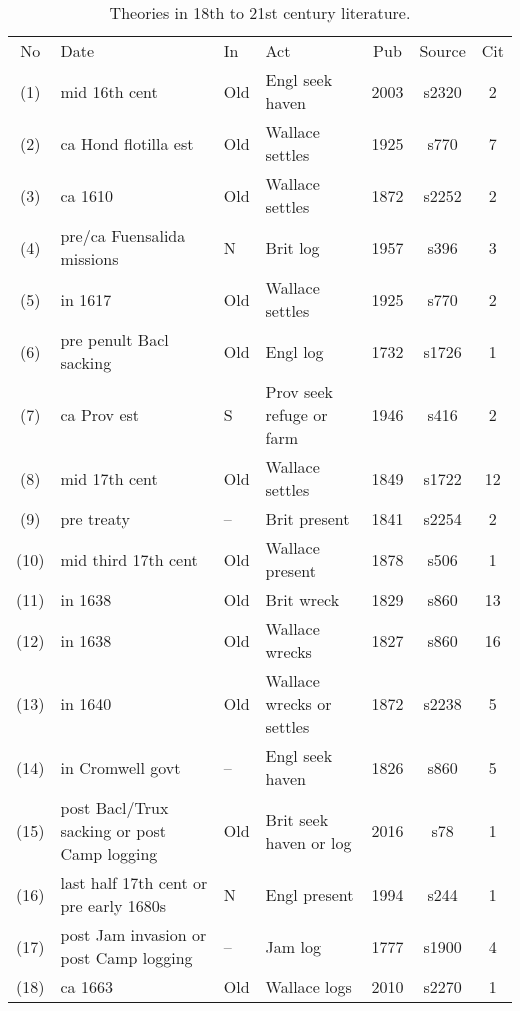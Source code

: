 \begin{table} %
\caption{Theories in 18th to 21st century literature.}
\label{tab:literature}
\begin{sideways}
\begin{tabular}{cp{.35\textheight}lp{.2\textheight}ccc}
No	&Date	&In	&Act	&Pub&Source	&Cit\\
(1)	&mid 16th cent	&Old	&Engl seek haven	&2003	&s2320	&2\\ %
(2)	&ca Hond flotilla est	&Old	&Wallace settles	&1925	&s770	&7\\ %
(3)	&ca 1610	&Old&Wallace settles	&1872	&s2252	&2\\ %
(4)	&pre/ca Fuensalida missions	&N	&Brit log	&1957	&s396	&3\\ %
(5)	&in 1617	&Old	&Wallace settles	&1925	&s770	&2\\ %
(6)	&pre penult Bacl sacking	&Old	&Engl log	&1732	&s1726	&1\\ %
(7)	&ca Prov est	&S &Prov seek refuge or farm	&1946	&s416	&2\\ %
(8)	&mid 17th cent	&Old	&Wallace settles	&1849	&s1722	&12\\ %
(9)	&pre treaty	&--	&Brit present	&1841	&s2254	&2\\ %
(10)	&mid third 17th cent	&Old	&Wallace present	&1878	&s506	&1\\ %
(11)	&in 1638	&Old	&Brit wreck	&1829	&s860	&13\\ %
(12)	&in 1638	&Old	&Wallace wrecks	&1827	&s860	&16\\ %
(13)	&in 1640	&Old	&Wallace wrecks or settles	&1872	&s2238	&5\\ %
(14)	&in Cromwell govt	&--	&Engl seek haven	&1826	&s860	&5\\ %
(15)	&post Bacl/Trux sacking or post Camp logging	&Old	&Brit seek haven or log	&2016	&s78	&1\\ %
(16)	&last half 17th cent or pre early 1680s	&N	&Engl present	&1994	&s244	&1\\ %
(17)	&post Jam invasion or post Camp logging	&--	&Jam log	&1777	&s1900	&4\\ %
(18)	&ca 1663	&Old	&Wallace logs	&2010	&s2270	&1\\ %

\end{tabular}
\end{sideways}
\end{table}
